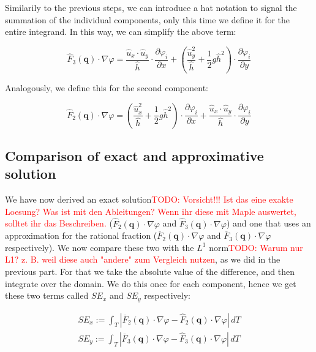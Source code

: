 \documentclass{article}
\newcommand{\todo}[2][]{\textcolor{red}{TODO\ifthenelse{\equal{#1}{}}{}{[#1]}: #2}}
\newcommand{\pd}[2]{\dfrac{\partial #1}{\partial #2}}
\renewcommand{\phi}{\varphi}
\begin{document}
Similarily to the previous steps, we can introduce a hat notation to signal the summation of the individual components, only this time we define it for the entire integrand. In this way, we can simplify the above term:

\begin{equation}
  \label{eq:stiffness-analysis-third-line-exact-approx-simple}
  \widehat{F}_3(\mathbf{q}) \cdot \nabla \phi=
  \frac{\widehat{u}_x \cdot \widehat{u}_y }{\widehat{h}} \cdot \pd{\phi_i}{x} +
  \left( \frac{\widehat{u}_y^2}{\widehat{h}} + \frac{1}{2} g \widehat{h}^2 \right) \cdot \pd{\phi_i}{y}
\end{equation}

Analogously, we define this for the second component:

\begin{equation}
  \label{eq:stiffness-analysis-second-line-exact-approx-simple}
  \widehat{F}_2(\mathbf{q}) \cdot \nabla \phi =
  \left( \frac{\widehat{u}_x^2}{\widehat{h}} + \frac{1}{2} g \widehat{h}^2 \right) \cdot \pd{\phi_i}{x} +
  \frac{\widehat{u}_x \cdot \widehat{u}_y }{\widehat{h}} \cdot \pd{\phi_i}{y}
\end{equation}

\subsection{Comparison of exact and approximative solution}

We have now derived an exact solution\todo{Vorsicht!!! Ist das eine exakte Loesung? Was ist mit den Ableitungen? Wenn ihr diese mit Maple auswertet, solltet ihr das Beschreiben.} ($\widehat{F}_2(\mathbf{q}) \cdot \nabla \phi$ and $\widehat{F}_3(\mathbf{q}) \cdot \nabla \phi$) and one that uses an approximation for the rational fraction ($\overline{F}_2(\mathbf{q}) \cdot \nabla \phi$ and $\overline{F}_3(\mathbf{q}) \cdot \nabla \phi$ respectively). We now compare these two with the $L^1$ norm\todo{Warum nur L1? z. B. weil diese auch "andere" zum Vergleich nutzen}, as we did in the previous part. For that we take the absolute value of the difference, and then integrate over the domain. We do this once for each component, hence we get these two terms called $SE_x$ and $SE_y$ respectively:

\begin{eqnarray*}
  SE_x := \int_T \left| \overline{F}_2(\mathbf{q}) \cdot \nabla \phi - \widehat{F}_2(\mathbf{q}) \cdot \nabla \phi \right| \, dT\\
  SE_y := \int_T \left| \overline{F}_3(\mathbf{q}) \cdot \nabla \phi - \widehat{F}_3(\mathbf{q}) \cdot \nabla \phi \right| \, dT
\end{eqnarray*}
\end{document}
